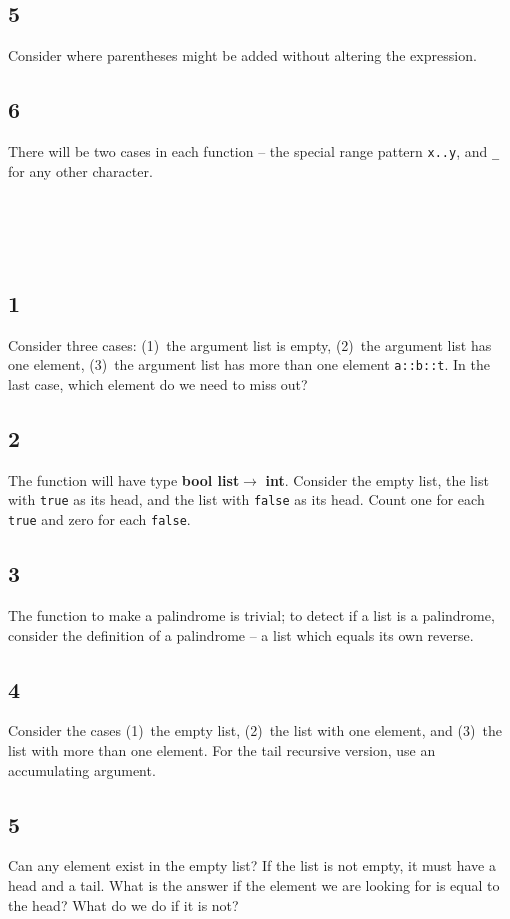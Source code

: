 \documentclass[]{book}
\begin{document}
\begin{multicols*}{2}
\subsection*{5}
Consider where parentheses might be added without altering the expression.
\subsection*{6}
There will be two cases in each function -- the special range pattern \texttt{x..y}, and \texttt{\_} for any other character.

\section*{\\ }
\subsection*{1}
Consider three cases: (1)~the argument list is empty, (2)~the argument list has one element, (3)~the argument list has more than one element \texttt{a::b::t}. In the last case, which element do we need to miss out?
\subsection*{2}
The function will have type \textsf{\textbf{bool list}}$ \rightarrow$ \textsf{\textbf{int}}. Consider the empty list, the list with \texttt{true} as its head, and the list with \texttt{false} as its head. Count one for each \texttt{true} and zero for each \texttt{false}.
\subsection*{3}
The function to make a palindrome is trivial; to detect if a list is a palindrome, consider the definition of a palindrome -- a list which equals its own reverse.
\subsection*{4}
Consider the cases (1)~the empty list, (2)~the list with one element, and (3)~the list with more than one element. For the tail recursive version, use an accumulating argument.
\subsection*{5}
Can any element exist in the empty list? If the list is not empty, it must have a head and a tail. What is the answer if the element we are looking for is equal to the head? What do we do if it is not?

\end{multicols*}
\end{document}
